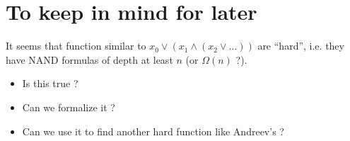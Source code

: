 \documentclass{article}
\theoremstyle{plain}
\theoremstyle{definition}
\begin{document}
\section{To keep in mind for later}
It seems that function similar to $x_0 \vee (x_1 \wedge (x_2 \vee \ldots))$
are ``hard'', i.e. they have NAND formulas of depth at least $n$ (or $\Omega(n)$ ?).

\begin{itemize}
	\item Is this true ?
	\item Can we formalize it ?
	\item Can we use it to find another hard function like Andreev's ?
\end{itemize}
\end{document}
